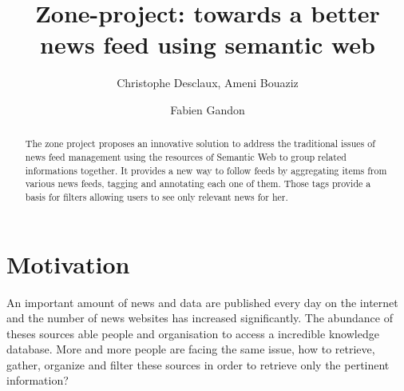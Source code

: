 \documentclass{llncs}
\begin{document}
%
\frontmatter          %
%
\pagestyle{headings}  %
%

\mainmatter              %
%
\title{Zone-project: towards a better news feed using semantic web}
%
%
\author{Christophe Desclaux, Ameni Bouaziz \and Fabien Gandon }
%
%
%



\maketitle

\begin{abstract}%
The zone project proposes an innovative solution to address the traditional issues of news feed management using the resources of Semantic Web to group related informations together.
It provides a new way to follow feeds by aggregating items from various news feeds, tagging and annotating each one of them. Those tags provide a basis for filters allowing users to see only relevant news for her.

{}
\end{abstract}
%
\section{Motivation}
%
An important amount of news and data are published every day on the internet and the number of news websites has increased significantly. The abundance of theses sources able people and organisation to access a incredible knowledge database. More and more people are facing the same issue, how to retrieve, gather, organize and filter these sources in order to retrieve only the pertinent information?
\end{document}
